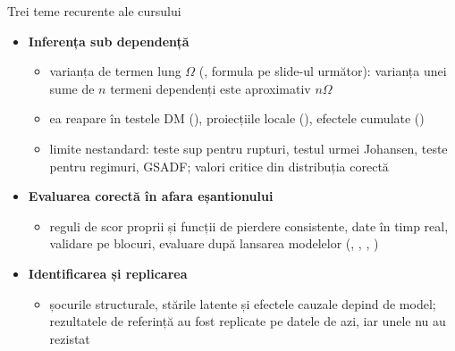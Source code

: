 \begin{frame}{Trei teme recurente ale cursului}
\itemsize{\small}
\begin{itemize}
    \item \textbf{Inferența sub dependență}
    \begin{itemize}
        \item varianța de termen lung $\Omega$ (, formula pe slide-ul următor): varianța unei sume de $n$ termeni dependenți este aproximativ $n\Omega$
        \item ea reapare în testele DM (), proiecțiile locale (), efectele cumulate ()
        \item limite nestandard: teste sup pentru rupturi, testul urmei Johansen, teste pentru regimuri, GSADF; valori critice din distribuția corectă
    \end{itemize}
    \item \textbf{Evaluarea corectă în afara eșantionului}
    \begin{itemize}
        \item reguli de scor proprii și funcții de pierdere consistente, date în timp real, validare pe blocuri, evaluare după lansarea modelelor (, , , )
    \end{itemize}
    \item \textbf{Identificarea și replicarea}
    \begin{itemize}
        \item șocurile structurale, stările latente și efectele cauzale depind de model; rezultatele de referință au fost replicate pe datele de azi, iar unele nu au rezistat
    \end{itemize}
\end{itemize}
\end{frame}


